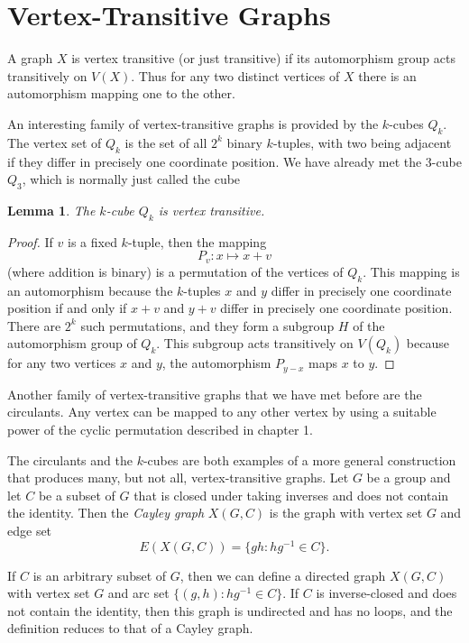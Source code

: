 \documentclass[12pt,a4paper,openany]{book}
\newtheorem{lemma}{Lemma}[section]
\begin{document}
\section{Vertex-Transitive Graphs}

A graph $X$ is vertex transitive (or just transitive) if its automorphism group 
acts transitively on $V(X)$. Thus for any two distinct vertices of $X$ there is 
an automorphism mapping one to the other.

An interesting family of vertex-transitive graphs is provided by the $k$-cubes $Q_k$. 
The vertex set of $Q_k$ is the set of all $2^k$ binary $k$-tuples, with two being adjacent if they differ in precisely one coordinate position. 
We have already met the 3-cube $Q_3$, which is normally just called the cube 


\begin{lemma}
The $k$-cube $Q_k$ is vertex transitive.
\end{lemma}

\begin{proof}
If $v$ is a fixed $k$-tuple, then the mapping
\[
P_v : x \mapsto x + v
\]
(where addition is binary) is a permutation of the vertices of $Q_k$. This mapping is an automorphism because the $k$-tuples $x$ and $y$ differ in precisely one coordinate position if and only if $x + v$ and $y + v$ differ in precisely one coordinate position. There are $2^k$ such permutations, and they form a subgroup $H$ of the automorphism group of $Q_k$. This subgroup acts transitively on $V(Q_k)$ because for any two vertices $x$ and $y$, the automorphism $P_{y-x}$ maps $x$ to $y$.
\end{proof}

Another family of vertex-transitive graphs that we have met before are the circulants. Any vertex can be mapped to any other vertex by using a suitable power of the cyclic permutation described in chapter 1.

The circulants and the $k$-cubes are both examples of a more general construction that produces many, but not all, vertex-transitive graphs. Let $G$ be a group and let $C$ be a subset of $G$ that is closed under taking inverses and does not contain the identity. Then the \emph{Cayley graph} $X(G, C)$ is the graph with vertex set $G$ and edge set
\[
E(X(G, C)) = \{gh : hg^{-1} \in C\}.
\]

If $C$ is an arbitrary subset of $G$, then we can define a directed graph $X(G, C)$ with vertex set $G$ and arc set $\{(g, h) : hg^{-1} \in C\}$. If $C$ is inverse-closed and does not contain the identity, then this graph is undirected and has no loops, and the definition reduces to that of a Cayley graph. 
\end{document}
